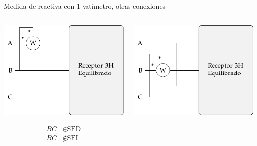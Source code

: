 \documentclass[aspectratio=169, usenames,svgnames,dvipsnames]{beamer}
\begin{document}
\begin{frame}{Medida de reactiva con 1 vatímetro, \hspace{3mm}otras conexiones} \label{diapo:1vat_reactiva_1}
    \begin{columns}
    \begin{column}{0.33\columnwidth}
        \begin{center}
            \includegraphics[width=.9\linewidth]{../figs/Reactiva3H_A-BC.pdf}
        \end{center}

        \vspace{-10mm}
        \begin{align*}
          BC &\in \text{SFD}\\
          BC &\notin \text{SFI}
        \end{align*}
    \end{column}
    \begin{column}{0.33\columnwidth}
        \begin{center}
            \includegraphics[width=.9\linewidth]{../figs/Reactiva3H_B-CA.pdf}
        \end{center}


\end{column}
\end{columns}
\end{frame}
\end{document}
